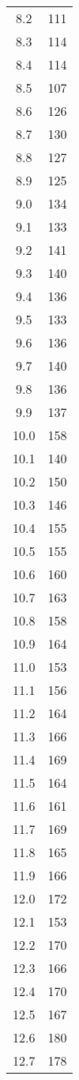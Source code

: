 \begin{tabular}{S[table-format=2.1]S[table-format=4.0]}
		8.2 &  111 \\
		8.3 &  114 \\
		8.4 &  114 \\
		8.5 &  107 \\
		8.6 &  126 \\
		8.7 &  130 \\
		8.8 &  127 \\
		8.9 &  125 \\
		9.0 &  134 \\
		9.1 &  133 \\
		9.2 &  141 \\
		9.3 &  140 \\
		9.4 &  136 \\
		9.5 &  133 \\
		9.6 &  136 \\
		9.7 &  140 \\
		9.8 &  136 \\
		9.9 &  137 \\
		10.0 &  158 \\
		10.1 &  140 \\
		10.2 &  150 \\
		10.3 &  146 \\
		10.4 &  155 \\
		10.5 &  155 \\
		10.6 &  160 \\
		10.7 &  163 \\
		10.8 &  158 \\
		10.9 &  164 \\
		11.0 &  153 \\
		11.1 &  156 \\
		11.2 &  164 \\
		11.3 &  166 \\
		11.4 &  169 \\
		11.5 &  164 \\
		11.6 &  161 \\
		11.7 &  169 \\
		11.8 &  165 \\
		11.9 &  166 \\
		12.0 &  172 \\
		12.1 &  153 \\
		12.2 &  170 \\
		12.3 &  166 \\
		12.4 &  170 \\
		12.5 &  167 \\
		12.6 &  180 \\
		12.7 &  178 \\

\end{tabular}

